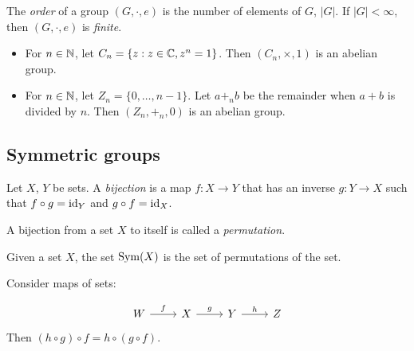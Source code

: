 \documentclass{../../template/note}
\begin{document}
    \begin{definition}
        The \emph{order} of a group \((G, \cdot, e)\) is the number of elements of \(G\), \(|G|\). If \(|G| < \infty\), then \((G, \cdot, e)\) is \emph{finite}.
    \end{definition}
    
    \begin{example*}
        \begin{itemize}
            \item For \(n \in \mathbb N\), let \(C_n = \{z: z \in \mathbb C, z^n = 1\}\). Then \((C_n, \times, 1)\) is an abelian group.
            \item For \(n \in \mathbb N\), let \(Z_n = \{0, \dots, n-1\}\). Let \(a +_n b\) be the remainder when \(a + b\) is divided by \(n\). Then \((Z_n, +_n, 0)\) is an abelian group.
        \end{itemize}
        
        
    \end{example*}


    \subsection{Symmetric groups}

    \begin{definition}
        Let \(X\), \(Y\) be sets. A \emph{bijection} is a map \(f: X \to Y\) that has an inverse \(g: Y \to X\) such that \(f \circ g = \operatorname{id}_Y\) and \(g \circ f = \operatorname{id}_X\).
    \end{definition}
    
    \begin{definition}
        A bijection from a set \(X\) to itself is called a \emph{permutation}.
    \end{definition}
    
    \begin{definition}
        Given a set \(X\), the set \(\operatorname{Sym}(X)\) is the set of permutations of the set.
    \end{definition}
    
    \begin{lemma}
        Consider maps of sets:

        \[\begin{tikzcd}
            W & X & Y & Z
            \arrow["f", from=1-1, to=1-2]
            \arrow["g", from=1-2, to=1-3]
            \arrow["h", from=1-3, to=1-4]
        \end{tikzcd}\]
        Then \((h \circ g) \circ f = h \circ (g \circ f)\).
        \label{associativity-of-function-composition}
    \end{lemma}
    
\end{document}
